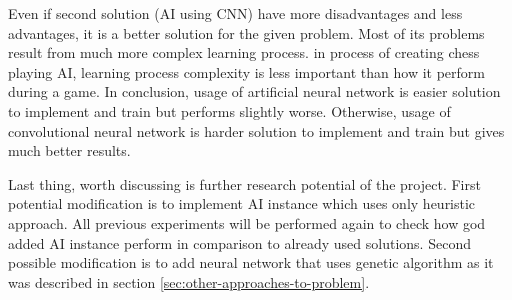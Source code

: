 Even if second solution (AI using CNN) have more disadvantages and less advantages, it is a better solution for the given problem. Most of its problems result from much more complex learning process. in process of creating chess playing AI, learning process complexity is less important than how it perform during a game. In conclusion, usage of artificial neural network is easier solution to implement and train but performs slightly worse. Otherwise, usage of convolutional neural network is harder solution to implement and train but gives much better results.

Last thing, worth discussing is further research potential of the project. First potential modification is to implement AI instance which uses only heuristic approach. All previous experiments will be performed again to check how god added AI instance perform in comparison to already used solutions. Second possible modification is to add neural network that uses genetic algorithm as it was described in section \ref{sec:other-approaches-to-problem}.


